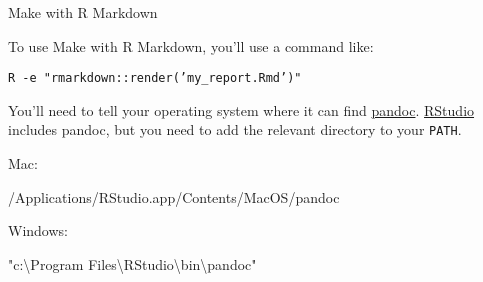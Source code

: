 \documentclass[12pt,t]{beamer}
\begin{document}
\begin{frame}[c]{Make with R Markdown}


  To use Make with R Markdown, you'll use a command like:

  \vspace{3mm}

  {\tt R -e "rmarkdown::render('my\_report.Rmd')"}

  \vspace{3mm}

  You'll need to tell your operating system
where it can find \href{https://pandoc.org/}{pandoc}.
\href{http://www.rstudio.com}{RStudio} includes pandoc, but you need
to add the relevant directory to your {\tt PATH}.

\vspace{24pt}

\hspace{3mm} {\hilit Mac}:

\vspace{6pt}

\hspace{9mm} {\ttsm /Applications/RStudio.app/Contents/MacOS/pandoc}

\vspace{24pt}

\hspace{3mm} {\hilit Windows}:

\vspace{6pt}

\hspace{9mm} {\ttsm "c:{\textbackslash}Program Files{\textbackslash}RStudio{\textbackslash}bin{\textbackslash}pandoc"}


\end{frame}
\end{document}
